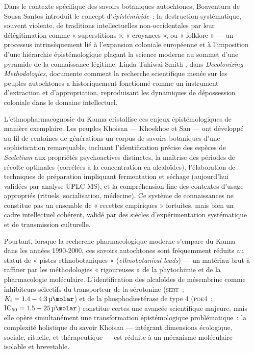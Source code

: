 \documentclass[12pt,a4paper,twoside]{book}
\begin{document}
Dans le contexte spécifique des savoirs botaniques autochtones, Boaventura de Sousa Santos \parencite{santos2014} introduit le concept d'\textit{épistémicide}~: la destruction systématique, souvent violente, de traditions intellectuelles non-occidentales par leur délégitimation comme « superstitions », « croyances », ou « folklore » --- un processus intrinsèquement lié à l'expansion coloniale européenne et à l'imposition d'une hiérarchie épistémologique plaçant la science moderne au sommet d'une pyramide de la connaissance légitime. Linda Tuhiwai Smith \parencite{smith1999}, dans \textit{Decolonizing Methodologies}, documente comment la recherche scientifique menée sur les peuples autochtones a historiquement fonctionné comme un instrument d'extraction et d'appropriation, reproduisant les dynamiques de dépossession coloniale dans le domaine intellectuel.

L'ethnopharmacognosie du Kanna cristallise ces enjeux épistémologiques de manière exemplaire. Les peuples Khoisan --- Khoekhoe et San --- ont développé au fil de centaines de générations un corpus de savoirs botaniques d'une sophistication remarquable, incluant l'identification précise des espèces de \textit{Sceletium} aux propriétés psychoactives distinctes, la maîtrise des périodes de récolte optimales (corrélées à la concentration en alcaloïdes), l'élaboration de techniques de préparation impliquant fermentation et séchage (aujourd'hui validées par analyse UPLC-MS), et la compréhension fine des contextes d'usage appropriés (rituels, socialisation, médecine). Ce système de connaissances ne constitue pas un ensemble de « recettes empiriques » fortuites, mais bien un cadre intellectuel cohérent, validé par des siècles d'expérimentation systématique et de transmission culturelle.

Pourtant, lorsque la recherche pharmacologique moderne s'empare du Kanna dans les années 1990-2000, ces savoirs autochtones sont fréquemment réduits au statut de « pistes ethnobotaniques » (\textit{ethnobotanical leads}) --- un matériau brut à raffiner par les méthodologies « rigoureuses » de la phytochimie et de la pharmacologie moléculaire. L'identification des alcaloïdes de mésembrine comme inhibiteurs sélectifs du transporteur de la sérotonine (\textsc{sert}~; $K_i = \SI{1.4}{}-\SI{4.3}{\micro\molar}$) et de la phosphodiestérase de type 4 (\textsc{pde4}~; $\mathrm{IC}_{50} = \SI{1.5}{}-\SI{25}{\micro\molar}$) constitue certes une avancée scientifique majeure, mais elle opère simultanément une transformation épistémologique problématique~: la complexité holistique du savoir Khoisan --- intégrant dimensions écologique, sociale, rituelle, et thérapeutique --- est réduite à un mécanisme moléculaire isolable et brevetable.
\end{document}
